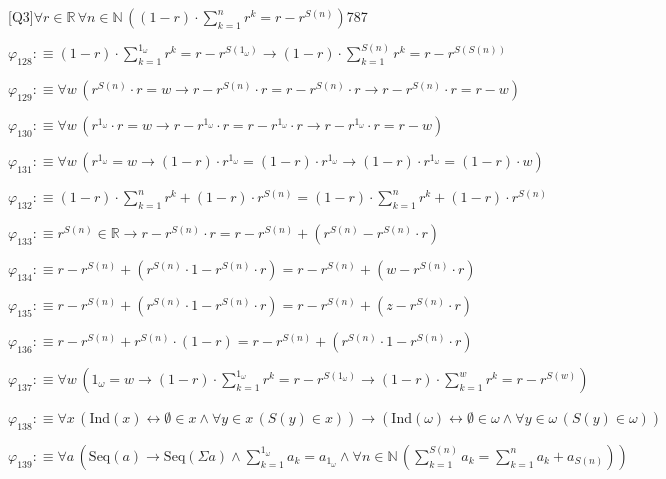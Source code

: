 \begin{fullproof}{[Q3]}{$\forall r \in \mathbb{R}\,\forall n \in \mathbb{N}\,((1 - r) \cdot {\textstyle\sum_{k=1}^{n} {{r}^{k}}} = r - {{r}^{S(n)}})$}{787}
\begin{abbrevlist}
\item $\varphi_{128} :\equiv (1 - r) \cdot {\textstyle\sum_{k=1}^{1_{\omega}} {{r}^{k}}} = r - {{r}^{S(1_{\omega})}} \to (1 - r) \cdot {\textstyle\sum_{k=1}^{S(n)} {{r}^{k}}} = r - {{r}^{S(S(n))}}$
\item $\varphi_{129} :\equiv \forall w\,({{r}^{S(n)}} \cdot r = w \to r - {{r}^{S(n)}} \cdot r = r - {{r}^{S(n)}} \cdot r \to r - {{r}^{S(n)}} \cdot r = r - w)$
\item $\varphi_{130} :\equiv \forall w\,({{r}^{1_{\omega}}} \cdot r = w \to r - {{r}^{1_{\omega}}} \cdot r = r - {{r}^{1_{\omega}}} \cdot r \to r - {{r}^{1_{\omega}}} \cdot r = r - w)$
\item $\varphi_{131} :\equiv \forall w\,({{r}^{1_{\omega}}} = w \to (1 - r) \cdot {{r}^{1_{\omega}}} = (1 - r) \cdot {{r}^{1_{\omega}}} \to (1 - r) \cdot {{r}^{1_{\omega}}} = (1 - r) \cdot w)$
\item $\varphi_{132} :\equiv (1 - r) \cdot {\textstyle\sum_{k=1}^{n} {{r}^{k}}} + (1 - r) \cdot {{r}^{S(n)}} = (1 - r) \cdot {\textstyle\sum_{k=1}^{n} {{r}^{k}}} + (1 - r) \cdot {{r}^{S(n)}}$
\item $\varphi_{133} :\equiv {{r}^{S(n)}} \in \mathbb{R} \to r - {{r}^{S(n)}} \cdot r = r - {{r}^{S(n)}} + ({{r}^{S(n)}} - {{r}^{S(n)}} \cdot r)$
\item $\varphi_{134} :\equiv r - {{r}^{S(n)}} + ({{r}^{S(n)}} \cdot 1 - {{r}^{S(n)}} \cdot r) = r - {{r}^{S(n)}} + (w - {{r}^{S(n)}} \cdot r)$
\item $\varphi_{135} :\equiv r - {{r}^{S(n)}} + ({{r}^{S(n)}} \cdot 1 - {{r}^{S(n)}} \cdot r) = r - {{r}^{S(n)}} + (z - {{r}^{S(n)}} \cdot r)$
\item $\varphi_{136} :\equiv r - {{r}^{S(n)}} + {{r}^{S(n)}} \cdot (1 - r) = r - {{r}^{S(n)}} + ({{r}^{S(n)}} \cdot 1 - {{r}^{S(n)}} \cdot r)$
\item $\varphi_{137} :\equiv \forall w\,(1_{\omega} = w \to (1 - r) \cdot {\textstyle\sum_{k=1}^{1_{\omega}} {{r}^{k}}} = r - {{r}^{S(1_{\omega})}} \to (1 - r) \cdot {\textstyle\sum_{k=1}^{w} {{r}^{k}}} = r - {{r}^{S(w)}})$
\item $\varphi_{138} :\equiv \forall x\,(\mathrm{Ind}(x) \leftrightarrow \emptyset \in x \land \forall y \in x\,(S(y) \in x)) \to (\mathrm{Ind}(\omega) \leftrightarrow \emptyset \in \omega \land \forall y \in \omega\,(S(y) \in \omega))$
\item $\varphi_{139} :\equiv \forall a\,(\mathrm{Seq}(a) \to \mathrm{Seq}(\Sigma a) \land {\textstyle\sum_{k=1}^{1_{\omega}} a_{k}} = a_{1_{\omega}} \land \forall n \in \mathbb{N}\,({\textstyle\sum_{k=1}^{S(n)} a_{k}} = {\textstyle\sum_{k=1}^{n} a_{k}} + a_{S(n)}))$

\end{abbrevlist}
\end{fullproof}

